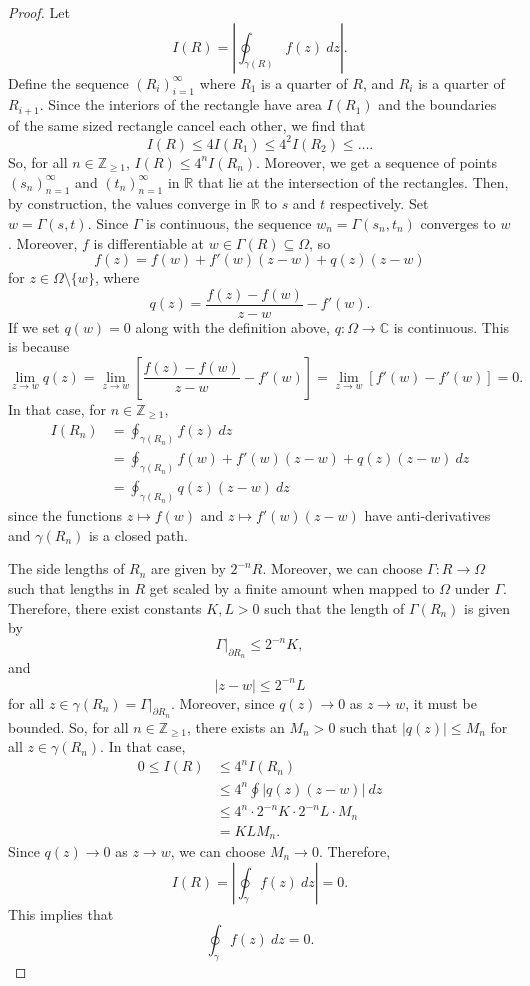 \documentclass[a4paper, openany]{memoir}
\theoremstyle{definition}
\theoremstyle{plain}
\begin{document}
\begin{proof}
Let
\[I(R) = \left|\oint_{\gamma(R)} f(z) \ dz\right|.\]
Define the sequence $(R_i)_{i=1}^\infty$ where $R_1$ is a quarter of $R$, and $R_i$ is a quarter of $R_{i+1}$. Since the interiors of the rectangle have area $I(R_1)$ and the boundaries of the same sized rectangle cancel each other, we find that
\[I(R) \leq 4I(R_1) \leq 4^2 I(R_2) \leq \dots.\]
So, for all $n \in \mathbb{Z}_{\geq 1}$, $I(R) \leq 4^n I(R_n)$. Moreover, we get a sequence of points $(s_n)_{n=1}^{\infty}$ and $(t_n)_{n=1}^\infty$ in $\mathbb{R}$ that lie at the intersection of the rectangles. Then, by construction, the values converge in $\mathbb{R}$ to $s$ and $t$ respectively. Set $w = \Gamma(s, t)$. Since $\Gamma$ is continuous, the sequence $w_n = \Gamma(s_n, t_n)$ converges to $w$. Moreover, $f$ is differentiable at $w \in \Gamma(R) \subseteq \Omega$, so
\[f(z) = f(w) + f'(w)(z - w) + q(z) (z - w)\]
for $z \in \Omega \setminus \{w\}$, where 
\[q(z) = \frac{f(z) - f(w)}{z - w} - f'(w).\]
If we set $q(w) = 0$ along with the definition above, $q: \Omega \to \mathbb{C}$ is continuous. This is because
\[\lim_{z \to w} q(z) = \lim_{z \to w} \left[\frac{f(z) - f(w)}{z - w} - f'(w)\right] = \lim_{z \to w} [f'(w) - f'(w)] = 0.\]
In that case, for $n \in \mathbb{Z}_{\geq 1}$,
\begin{align*}
    I(R_n) &= \oint_{\gamma(R_n)} f(z) \ dz \\
    &= \oint_{\gamma(R_n)} f(w) + f'(w) (z - w) + q(z) (z - w) \ dz \\
    &= \oint_{\gamma(R_n)} q(z) (z - w) \ dz
\end{align*}
since the functions $z \mapsto f(w)$ and $z \mapsto f'(w) (z - w)$ have anti-derivatives and $\gamma(R_n)$ is a closed path.

\noindent The side lengths of $R_n$ are given by $2^{-n} R$. Moreover, we can choose $\Gamma: R \to \Omega$ such that lengths in $R$ get scaled by a finite amount when mapped to $\Omega$ under $\Gamma$. Therefore, there exist constants $K, L > 0$ such that the length of $\Gamma(R_n)$ is given by
\[\Gamma|_{\partial R_n} \leq 2^{-n} K,\]
and
\[|z - w| \leq 2^{-n}L\]
for all $z \in \gamma(R_n) = \Gamma|_{\partial R_n}$.
Moreover, since $q(z) \to 0$ as $z \to w$, it must be bounded. So, for all $n \in \mathbb{Z}_{\geq 1}$, there exists an $M_n > 0$ such that $|q(z)| \leq M_n$ for all $z \in \gamma(R_n)$. In that case,
\begin{align*}
    0 \leq I(R) &\leq 4^n I(R_n) \\
    &\leq 4^n \oint |q(z) (z - w)| \ dz \\
    &\leq 4^n \cdot 2^{-n}K \cdot 2^{-n} L \cdot M_n \\
    &= KL M_n.
\end{align*}
Since $q(z) \to 0$ as $z \to w$, we can choose $M_n \to 0$. Therefore, 
\[I(R) = \left|\oint_\gamma f(z) \ dz\right| = 0.\]
This implies that
\[\oint_\gamma f(z) \ dz = 0.\]
\end{proof}
\end{document}
